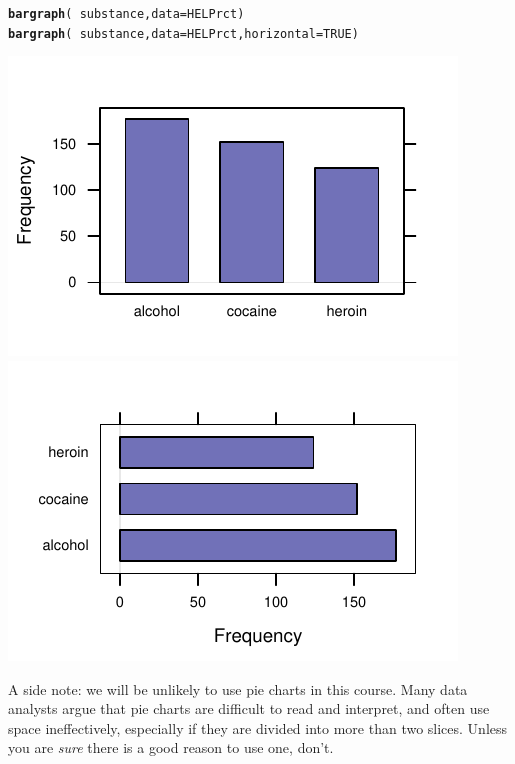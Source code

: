 \documentclass[twoside]{book}\usepackage[]{graphicx}\usepackage[]{xcolor}
\makeatletter
\def\maxwidth{ %
  \ifdim\Gin@nat@width>\linewidth
    \linewidth
  \else
    \Gin@nat@width
  \fi
}
\newcommand{\hlnum}[1]{\textcolor[rgb]{0.686,0.059,0.569}{#1}}%
\newcommand{\hlopt}[1]{\textcolor[rgb]{0,0,0}{#1}}%
\newcommand{\hlstd}[1]{\textcolor[rgb]{0.345,0.345,0.345}{#1}}%
\newcommand{\hlkwc}[1]{\textcolor[rgb]{0.333,0.667,0.333}{#1}}%
\newcommand{\hlkwd}[1]{\textcolor[rgb]{0.737,0.353,0.396}{\textbf{#1}}}%
\newenvironment{kframe}{%
 \def\at@end@of@kframe{}%
 \ifinner\ifhmode%
  \def\at@end@of@kframe{\end{minipage}}%
  \begin{minipage}{\columnwidth}%
 \fi\fi%
 \def\FrameCommand##1{\hskip\@totalleftmargin \hskip-\fboxsep
 \colorbox{shadecolor}{##1}\hskip-\fboxsep
     \hskip-\linewidth \hskip-\@totalleftmargin \hskip\columnwidth}%
 \MakeFramed {\advance\hsize-\width
   \@totalleftmargin\z@ \linewidth\hsize
   \@setminipage}}%
 {\par\unskip\endMakeFramed%
 \at@end@of@kframe}
\newenvironment{knitrout}{}{} %
\makeatother
\begin{document}
\begin{knitrout}
\color{fgcolor}\begin{kframe}
\begin{alltt}
\hlkwd{bargraph}\hlstd{(}\hlopt{~}\hlstd{substance,} \hlkwc{data} \hlstd{= HELPrct)}
\hlkwd{bargraph}\hlstd{(}\hlopt{~}\hlstd{substance,} \hlkwc{data} \hlstd{= HELPrct,} \hlkwc{horizontal} \hlstd{=} \hlnum{TRUE}\hlstd{)}
\end{alltt}
\end{kframe}

{\centering \includegraphics[width=\maxwidth]{figures/fig-bargraph-1} 
\includegraphics[width=\maxwidth]{figures/fig-bargraph-2} 

}



\end{knitrout}

A side note: we will be unlikely to use pie charts in this course.
Many data analysts argue that pie charts are difficult to read and interpret,
and often use space ineffectively, especially if they are divided into more than two slices.  Unless you are \textit{sure} 
there is a good reason to use one, don't.
\end{document}
